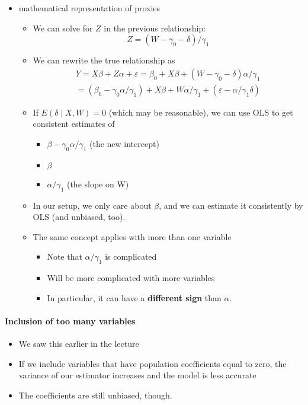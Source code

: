 \begin{itemize}

\item mathematical representation of proxies
\begin{itemize}
\item We can solve for $Z$ in the previous relationship:
           \[ Z = (W - \gamma_{0} - \delta ) / \gamma_{1} \]
\item We can rewrite the true relationship as
  \begin{multline} 
    Y = X \beta + Z \alpha + \varepsilon = \beta_{0} + X\beta + (W -
    \gamma_{0} - \delta) \alpha/\gamma_{1} \\ = (\beta_{0} -
    \gamma_{0}\alpha/\gamma_{1}) + X\beta + W
    \alpha/\gamma_{1} + (\varepsilon - \alpha/\gamma_{1} \delta)
  \end{multline}
\item If $E(\delta \mid X, W) = 0$ (which may be reasonable), we
           can use OLS to get consistent estimates of
\begin{itemize}
\item $\beta-\gamma_{0}\alpha/\gamma_{1}$ (the new intercept)
\item $\beta$
\item $\alpha/\gamma_{1}$ (the slope on W)
\end{itemize}
\item In our setup, we only care about $\beta$, and we can
           estimate it consistently by OLS (and unbiased, too).
\item The same concept applies with more than one variable
\begin{itemize}
\item Note that $\alpha/\gamma_{1}$ is complicated
\item Will be more complicated with more variables
\item In particular, it can have a \textbf{different sign} than $\alpha$.
\end{itemize}
\end{itemize}
\end{itemize}

\paragraph{Inclusion of too many variables}
\begin{itemize}
\item We saw this earlier in the lecture
\item If we include variables that have population coefficients equal
        to zero, the variance of our estimator increases and the model
        is less accurate
\item The coefficients are still unbiased, though.
\end{itemize}

